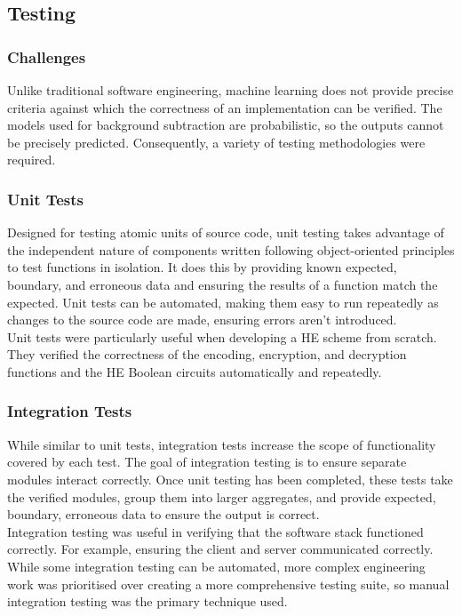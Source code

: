 \setlength{\leftskip}{0cm}

\subsection{Testing}
\label{sec:testing}
\subsubsection{Challenges}
\setlength{\leftskip}{0.5cm}
\indent \indent
Unlike traditional software engineering, machine learning does not provide precise criteria against which the correctness of an implementation can be verified. The models used for background subtraction are probabilistic, so the outputs cannot be precisely predicted.  Consequently, a variety of testing methodologies were required.

\setlength{\leftskip}{0cm}
\subsubsection{Unit Tests}
\setlength{\leftskip}{0.5cm}
\indent \indent
Designed for testing atomic units of source code, unit testing takes advantage of the independent nature of components written following object-oriented principles to test functions in isolation. It does this by providing known expected, boundary, and erroneous data and ensuring the results of a function match the expected. Unit tests can be automated, making them easy to run repeatedly as changes to the source code are made, ensuring errors aren't introduced.
\smallskip \\ \indent
Unit tests were particularly useful when developing a HE scheme from scratch. They verified the correctness of the encoding, encryption, and decryption functions and the HE Boolean circuits automatically and repeatedly.

\setlength{\leftskip}{0cm}
\subsubsection{Integration Tests}
\setlength{\leftskip}{0.5cm}
\indent \indent
While similar to unit tests, integration tests increase the scope of functionality covered by each test. The goal of integration testing is to ensure separate modules interact correctly. Once unit testing has been completed, these tests take the verified modules, group them into larger aggregates, and provide expected, boundary, erroneous data to ensure the output is correct.
\smallskip \\ \indent
Integration testing was useful in verifying that the software stack functioned correctly. For example, ensuring the client and server communicated correctly. While some integration testing can be automated, more complex engineering work was prioritised over creating a more comprehensive testing suite, so manual integration testing was the primary technique used.

